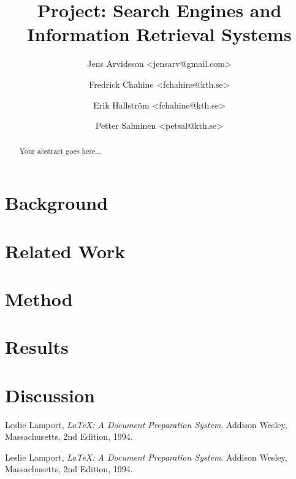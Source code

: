 \documentclass[a4paper,11pt,twoside]{ltxdoc}
\title{Project: Search Engines and Information Retrieval Systems}
\author{
Jens Arvidsson <jensarv@gmail.com> \and
Fredrick Chahine <fchahine@kth.se> \and
Erik Hallström  <fchahine@kth.se> \and
Petter Salminen <petsal@kth.se>}
\begin{document}
\maketitle
\tableofcontents

\newpage
\begin{abstract}
Your abstract goes here...

\end{abstract}

\newpage
\section{Background}


\section{Related Work}

\section{Method}

\section{Results}

\section{Discussion}

\newpage
\begin{thebibliography}{9}

  Leslie Lamport,
  \emph{\LaTeX: A Document Preparation System}.
  Addison Wesley, Massachusetts,
  2nd Edition,
  1994.

  Leslie Lamport,
  \emph{\LaTeX: A Document Preparation System}.
  Addison Wesley, Massachusetts,
  2nd Edition,
  1994.


\end{thebibliography}
\end{document}
